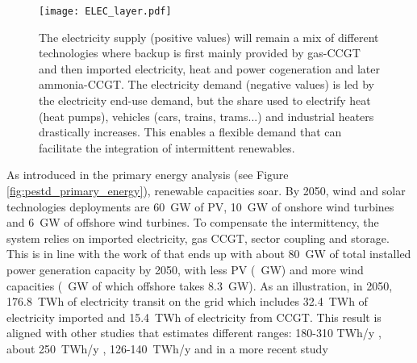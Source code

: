 \begin{figure}[!htbp]
     \centering
         \texttt{[image: ELEC\_layer.pdf]}
         \caption{The electricity supply (positive values) will remain a mix of different technologies where backup is first mainly provided by gas-\gls{CCGT} and then imported electricity, heat and power cogeneration and later ammonia-\gls{CCGT}. The electricity demand (negative values) is led by the electricity end-use demand, but the share used to electrify heat (heat pumps), vehicles (cars, trains, trams...) and industrial heaters drastically increases. This enables a flexible demand that can facilitate the integration of intermittent renewables.}
         \label{fig:ELEC_layer}
\end{figure}

As introduced in the primary energy analysis (see Figure \ref{fig:pestd_primary_energy}), renewable capacities soar. By 2050, wind and solar technologies deployments are 60~GW of \gls{PV}, 10~GW of onshore wind turbines and 6~GW of offshore wind turbines. To compensate the intermittency, the system relies on imported electricity, gas \gls{CCGT}, sector coupling and storage. This is in line with the work of \citet{Devogelaer2020} that ends up with about 80~GW of total installed power generation capacity by 2050, with less \gls{PV} (~GW) and more wind capacities (~GW of which offshore takes 8.3~GW). As an illustration, in 2050, 176.8~TWh of electricity transit on the grid which includes 32.4~TWh of electricity imported and 15.4~TWh of electricity from \gls{CCGT}. This result is aligned with other studies that estimates different ranges: 180-310 TWh/y \cite{Devogelaer2013}, about 250~TWh/y \cite{Devogelaer2020}, 126-140~TWh/y \cite{My2050} and in a more recent study 
